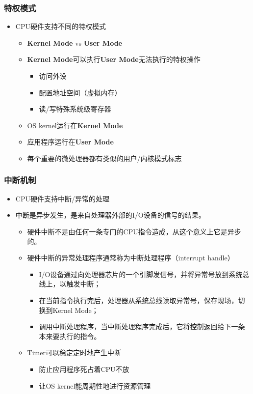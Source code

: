 \begin{frame}
	\frametitle{特权模式}
	\begin{itemize}
		\item CPU硬件支持不同的特权模式
		\begin{itemize}
			\item \textbf{Kernel Mode} vs \textbf{User Mode}
			\item \textbf{Kernel Mode}可以执行\textbf{User Mode}无法执行的特权操作
			\begin{itemize}
				\item 访问外设
				\item 配置地址空间（虚拟内存）
				\item 读/写特殊系统级寄存器
			\end{itemize}			
			
			\item OS kernel运行在\textbf{Kernel Mode} 
			\item 应用程序运行在\textbf{User Mode}
			\item 每个重要的微处理器都有类似的用户/内核模式标志
				
		\end{itemize}
	\end{itemize}
\end{frame}


\begin{frame}
	\frametitle{中断机制}
	\begin{itemize}
		\item CPU硬件支持中断/异常的处理
		\item 中断是异步发生，是来自处理器外部的I/O设备的信号的结果。
		\begin{itemize}
			\item 硬件中断不是由任何一条专门的CPU指令造成，从这个意义上它是异步的。
			\item 硬件中断的异常处理程序通常称为中断处理程序（interrupt handle）
			\begin{itemize}
				\item I/O设备通过向处理器芯片的一个引脚发信号，并将异常号放到系统总线上，以触发中断；
				\item 在当前指令执行完后，处理器从系统总线读取异常号，保存现场，切换到Kernel Mode；
				\item 调用中断处理程序，当中断处理程序完成后，它将控制返回给下一条本来要执行的指令。
			\end{itemize}			
			
			\item Timer可以稳定定时地产生中断
			\begin{itemize}
				\item 防止应用程序死占着CPU不放
				\item 让OS kernel能周期性地进行资源管理
			\end{itemize}				
		\end{itemize}
	\end{itemize}
\end{frame}



